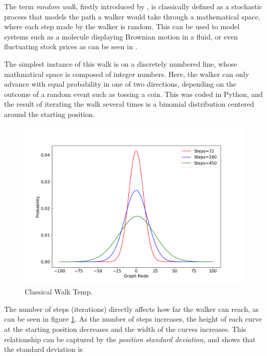 \documentclass[../../dissertation.tex]{subfiles}
\begin{document}
The term \textit{random walk}, firstly introduced by \cite{kpearson1905}, is classically defined as a stochastic process that models the path a walker would take through a mathematical space, where each step made by the walker is random. This can be used to model systems such as a molecule displaying Brownian motion in a fluid, or even fluctuating stock prices as can be seen in \cite{sottinen2001}.\par 
The simplest instance of this walk is on a discretely numbered line, whose mathmatical space is composed of integer numbers. Here, the walker can only advance with equal probability in one of two directions, depending on the outcome of a random event such as tossing a coin. This was coded in Python, and the result of iterating the walk several times is a binomial distribution centered around the starting position.\par
\begin{figure}[!h]
	\centering
	\includegraphics[scale=0.40]{img/ClassicalWalk/MultClassicalWalk72180450}
	\caption{Classical Walk Temp.} 
	\label{fig:MultClassicalWalk72180450}
\end{figure}
The number of steps (iterations) directly affects how far the walker can reach, as can be seen in figure \ref{fig:MultClassicalWalk72180450}. As the number of steps increases, the height of each curve at the starting position decreases and the width of the curves increases. This relationship can be captured by the \textit{position standard deviation}, and \cite{REN1} shows that the standard deviation is
\end{document}

